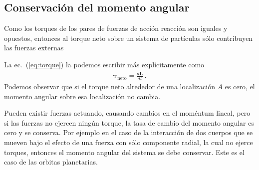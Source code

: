 \subsection{Conservación del momento angular}
Como los torques de los pares de fuerzas de acción reacción son iguales y opuestos, entonces al torque neto sobre un sistema de partículas sólo contribuyen las fuerzas externas

La ec.~(\ref{eq:torque}) la podemos escribir más explícitamente como
\begin{align}
  \label{eq:torqueneto}
  \boldsymbol{\tau}_{\text{neto}}=\frac{d\mathbf{L}}{dt}\,.
\end{align}
Podemos observar que si el torque neto alrededor de una localización
$A$ es cero, el momento angular sobre esa localización no cambia.

Pueden existir fuerzas actuando, causando cambios en el moméntum
lineal, pero si las fuerzas no ejercen ningún torque, la tasa de
cambio del momento angular es cero y se conserva. Por ejemplo en el
caso de la interacción de dos cuerpos que se mueven bajo el efecto de
una fuerza con sólo componente radial, la cual no ejerce torques,
entonces el momento angular del sistema se debe conservar. Este es el
caso de las orbitas planetarias.


